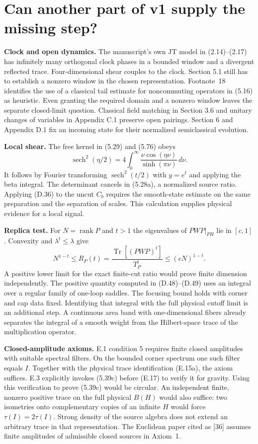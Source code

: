 \documentclass[12pt,a4paper]{article}
\newcommand{\topic}[1]{\section*{\color{ink}#1}}
\DeclareMathOperator{\Tr}{Tr}
\DeclareMathOperator{\rank}{rank}
\begin{document}
\clearpage
\topic{Can another part of v1 supply the missing step?}

\textbf{Clock and open dynamics.} The manuscript's own JT model in (2.14)--(2.17) has infinitely many orthogonal clock phases in a bounded window and a divergent reflected trace. Four-dimensional shear couples to the clock. Section 5.1 still has to establish a nonzero window in the chosen representation. Footnote~18 identifies the use of a classical tail estimate for noncommuting operators in (5.16) as heuristic. Even granting the required domain and a nonzero window leaves the separate closed-limit question. Classical field matching in Section 3.6 and unitary changes of variables in Appendix C.1 preserve open pairings. Section 6 and Appendix D.1 fix an incoming state for their normalized semiclassical evolution.

\textbf{Local shear.} The free kernel in (5.29) and (5.76) obeys
\[
 \operatorname{sech}^2(\eta/2)=4\int_0^\infty
 \frac{\nu\cos(\eta\nu)}{\sinh(\pi\nu)}\,d\nu.
\]
It follows by Fourier transforming $\operatorname{sech}^2(t/2)$ with $y=e^t$ and applying the beta integral. The determinant cancels in (5.28a), a normalized source ratio. Applying (D.36) to the uncut $C_b$ requires the smooth-state estimate on the same preparation and the separation of scales. This calculation supplies physical evidence for a local signal.

\textbf{Replica test.} For $N=\rank P$ and $t>1$ the eigenvalues of $PWP|_{PH}$ lie in $[c,1]$. Convexity and $\lambda^t\le\lambda$ give
\[
 N^{1-t}\le R_P(t)=\frac{\Tr[(PWP)^t]}{T_P^t}
 \le (cN)^{1-t}.
\]
A positive lower limit for the exact finite-cut ratio would prove finite dimension independently. The positive quantity computed in (D.48)--(D.49) uses an integral over a regular family of one-loop saddles. The focusing bound holds with corner and cap data fixed. Identifying that integral with the full physical cutoff limit is an additional step. A continuous area band with one-dimensional fibers already separates the integral of a smooth weight from the Hilbert-space trace of the multiplication operator.

\textbf{Closed-amplitude axioms.} E.1 condition 5 requires finite closed amplitudes with suitable spectral filters. On the bounded corner spectrum one such filter equals $I$. Together with the physical trace identification (E.15a), the axiom suffices. E.3 explicitly invokes (5.39c) before (E.17) to verify it for gravity. Using this verification to prove (5.39c) would be circular. An independent finite, nonzero positive trace on the full physical $B(H)$ would also suffice: two isometries onto complementary copies of an infinite $H$ would force $\tau(I)=2\tau(I)$. Strong density of the source algebra does not extend an arbitrary trace in that representation. The Euclidean paper cited as [36] assumes finite amplitudes of admissible closed sources in Axiom~1.
\end{document}
